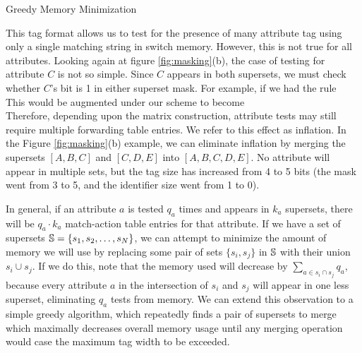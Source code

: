 \begin{algorithm}
\DontPrintSemicolon
{}
\caption{Greedy Memory Minimization\label{alg:memory_min}}
\end{algorithm}


This tag format allows us to test for the presence of many attribute tag using
only a single matching string in switch memory.  However, this is not true for
all attributes. Looking again at figure \ref{fig:masking}(b), the case of
testing for attribute $C$ is not so simple. Since $C$ appears in both supersets,
we must check whether $C$'s bit is 1 in either superset mask. For example, if we
had the rule\\ 
This would be augmented under our scheme to
become\\ 
Therefore, depending upon the matrix
construction, attribute tests may still require multiple forwarding table
entries. We refer to this effect as inflation. In the Figure
\ref{fig:masking}(b) example, we can eliminate inflation by merging the
supersets $[A,B,C]$ and $[C,D,E]$ into $[A,B,C,D,E]$. No attribute will appear
in multiple sets, but the tag size has increased from 4 to 5 bits (the mask went
from 3 to 5, and the identifier size went from 1 to 0).

In general, if an attribute $a$ is tested $q_a$ times and appears in $k_a$
supersets, there will be $q_a\cdot k_a$ match-action table entries for that
attribute. If we have a set of supersets $\mathbb{S} = \{s_1, s_2, \dots, s_N\}$, we
can attempt to minimize the amount of memory we will use by replacing some pair
of sets $\{s_i, s_j\}$ in $\mathbb{S}$ with their union $s_i\cup s_j$. If we do this,
note that the memory used will decrease by $\sum_{a \in s_i\cap s_j}q_a$,
because every attribute $a$ in the intersection of $s_i$ and $s_j$ will appear
in one less superset, eliminating $q_a$ tests from memory. We can extend this
observation to a simple greedy algorithm, which repeatedly finds a pair of
supersets to merge which maximally decreases overall memory usage until any
merging operation would case the maximum tag width to be exceeded. 


